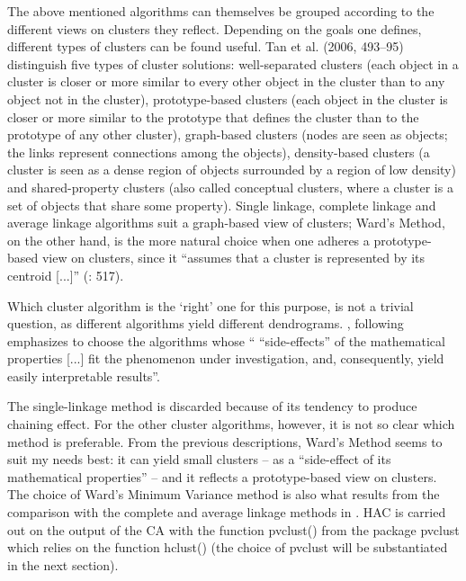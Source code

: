 The above mentioned algorithms can themselves be grouped according to the different views on clusters they reflect. Depending on the goals one defines, different types of clusters can be found useful. Tan et al. (2006, 493–95) distinguish five types of cluster solutions: well-separated clusters (each object in a cluster is closer or more similar to every other object in the cluster than to any object not in the cluster), prototype-based clusters (each object in the cluster is closer or more similar to the prototype that defines the cluster than to the prototype of any other cluster), graph-based clusters (nodes are seen as objects; the links represent connections among the objects), density-based clusters (a cluster is seen as a dense region of objects surrounded by a region of low density) and shared-property clusters (also called conceptual clusters, where a cluster is a set of objects that share some property). Single linkage, complete linkage and average linkage algorithms suit a graph-based view of clusters; Ward’s Method, on the other hand, is the more natural choice when one adheres a prototype-based view on clusters, since it “assumes that a cluster is represented by its centroid [...]” (\citealt{tan_introduction_2006}: 517).



Which cluster algorithm is the ‘right’ one for this purpose, is not a trivial question, as different algorithms yield different dendrograms. \citet[132]{divjak_structuring_2010}, following \citet[35]{speece_cluster_1994} emphasizes to choose the algorithms whose “ “side-effects” of the mathematical properties [...] fit the phenomenon under investigation, and, consequently, yield easily interpretable results”. 



The single-linkage method is discarded because of its tendency to produce chaining effect. For the other cluster algorithms, however, it is not so clear which method is preferable. From the previous descriptions, Ward’s Method seems to suit my needs best: it can yield small clusters – as a “side-effect of its mathematical properties” – and it reflects a prototype-based view on clusters. The choice of Ward’s Minimum Variance method is also what results from the comparison with the complete and average linkage methods in . HAC is carried out on the output of the CA with the function pvclust() from the package pvclust which relies on the function hclust() (the choice of pvclust will be substantiated in the next section).


